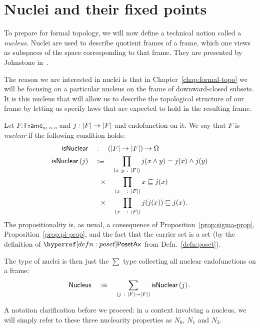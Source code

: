 \section{Nuclei and their fixed points}\label{sec:nuclei}

To prepare for formal topology, we will now define a technical notion called a
\emph{nucleus}. Nuclei are used to describe quotient frames of a frame, which one views as
subspaces of the space corresponding to that frame. They are presented by Johnstone
in~\cite[Sec.~II.2]{stone-spaces}.

The reason we are interested in nuclei is that in Chapter~\ref{chap:formal-topo} we will
be focusing on a particular nucleus on the frame of downward-closed subsets. It is this
nucleus that will allow us to describe the topological structure of our frame by letting
us specify laws that are expected to hold in the resulting frame.
\begin{defn}[Nucleus]\label{defn:nucleus}
  Let $F : \mathsf{Frame}_{m, n, o}$ and $j : \left| F \right| \rightarrow \left| F \right|$ and endofunction on it.
  We say that $F$ is \emph{nuclear} if the following condition holds:
  \begin{align*}
    \mathsf{isNuclear}{}\quad&:\quad (\left| F \right| \rightarrow \left| F \right|) \rightarrow \Omega                   \\
    \mathsf{isNuclear}{}\left(j\right) \quad&:\equiv\quad
       \prod_{(x~y~:~\left| F \right|)} j(x \wedge y) = j(x) \wedge j(y)  \\
      &\hspace{0.55em}\times\quad \prod_{(x~~~:~\left| F \right|)} x \sqsubseteq j(x)          \\
      &\hspace{0.55em}\times\quad \prod_{(x~~~:~\left| F \right|)} j(j(x)) \sqsubseteq j(x).
  \end{align*}
  The propositionality is, as usual, a consequence of Proposition~\ref{prop:sigma-prop},
  Proposition~\ref{prop:pi-prop}, and the fact that the carrier set is a set (by the
  definition of $\posetaxnm{}$ from Defn.~\ref{defn:poset}).

  The type of nuclei is then just the $\sum$ type collecting all nuclear endofunctions on a
  frame:
  \begin{equation*}
    \mathsf{Nucleus} \quad:\equiv\quad \sum_{(j~:~\left| F \right| \rightarrow \left| F \right|)} \mathsf{isNuclear}{}\left(j\right).
  \end{equation*}
\end{defn}


A notation clarification before we proceed: in a context involving a nucleus, we will
simply refer to these three nuclearity properties as $N_0$, $N_1$ and $N_2$.

